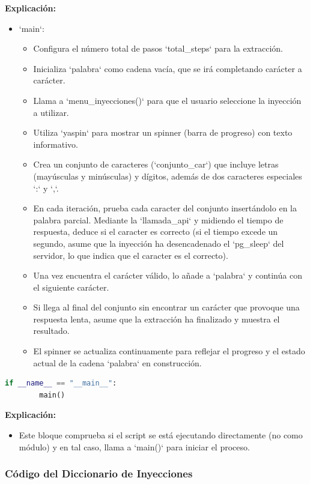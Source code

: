 \documentclass[a4paper,12pt]{article}
\begin{document}
\textbf{Explicación:}  
\begin{itemize}
\item `main`:
  \begin{itemize}
  \item Configura el número total de pasos `total\_steps` para la extracción.
  \item Inicializa `palabra` como cadena vacía, que se irá completando carácter a carácter.
  \item Llama a `menu\_inyecciones()` para que el usuario seleccione la inyección a utilizar.
  \item Utiliza `yaspin` para mostrar un spinner (barra de progreso) con texto informativo.
  \item Crea un conjunto de caracteres (`conjunto\_car`) que incluye letras (mayúsculas y minúsculas) y dígitos, además de dos caracteres especiales `:` y `,`.
  \item En cada iteración, prueba cada caracter del conjunto insertándolo en la palabra parcial. Mediante la `llamada\_api` y midiendo el tiempo de respuesta, deduce si el caracter es correcto (si el tiempo excede un segundo, asume que la inyección ha desencadenado el `pg\_sleep` del servidor, lo que indica que el caracter es el correcto).
  \item Una vez encuentra el carácter válido, lo añade a `palabra` y continúa con el siguiente carácter.
  \item Si llega al final del conjunto sin encontrar un carácter que provoque una respuesta lenta, asume que la extracción ha finalizado y muestra el resultado.
  \item El spinner se actualiza continuamente para reflejar el progreso y el estado actual de la cadena `palabra` en construcción.
  \end{itemize}
\end{itemize}


\begin{lstlisting}[language=Python]
    if __name__ == "__main__":
        main()
\end{lstlisting}

\textbf{Explicación:}  
\begin{itemize}
\item Este bloque comprueba si el script se está ejecutando directamente (no como módulo) y en tal caso, llama a `main()` para iniciar el proceso.
\end{itemize}


\subsubsection{Código del Diccionario de Inyecciones}
\end{document}
